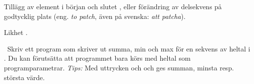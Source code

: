 \begin{ConceptConnections}

\end{ConceptConnections}

\Subtask Tillägg av element i början  och slutet , eller förändring av delsekvens på godtycklig plats (eng. \emph{to patch}, även på svenska: \emph{att patcha}).

\begin{ConceptConnections}

\end{ConceptConnections}

\Subtask Likhet .

\begin{ConceptConnections}

\end{ConceptConnections}


\SOLUTION

\TaskSolved \what

\Subtask

\begin{ConceptConnections}

\end{ConceptConnections}

\Subtask

\begin{ConceptConnections}

\end{ConceptConnections}

\Subtask

\begin{ConceptConnections}

\end{ConceptConnections}

\QUESTEND








\QUESTBEGIN

\Task \what~Skriv ett program som skriver ut summa, min och max för en sekvens av heltal i . Du kan förutsätta att programmet bara körs med heltal som programparametrar. \emph{Tips:} Med uttrycken  och  och  ges summan, minsta resp. största värde.

